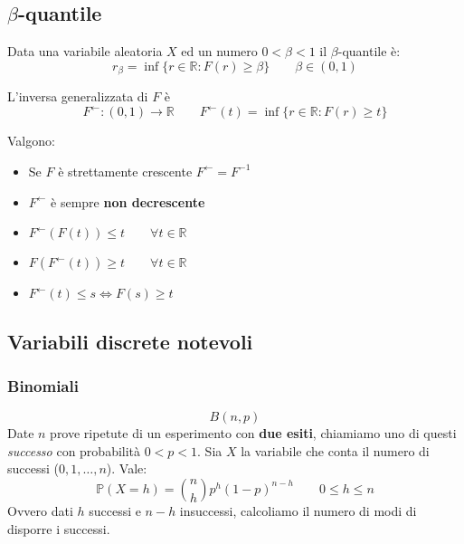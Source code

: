 \subsection{$\beta$-quantile}
\begin{definition}
	Data una variabile aleatoria $X$ ed un numero $0 < \beta < 1$ il $\beta$-quantile è:
	\begin{equation}
		r_\beta = \inf\{r \in \mathbb{R} : F(r) \geq \beta\} \quad\quad \beta \in (0,1)
	\end{equation}
\end{definition}
\begin{definition}
	L'inversa generalizzata di $F$ è
	\begin{equation}
		F^{\leftarrow}:(0,1) \to \mathbb{R} \quad\quad F^{\leftarrow}(t) = \inf\{r \in \mathbb{R} : F(r) \geq t\}
	\end{equation}
\end{definition}
\begin{proposition}
	Valgono:
	\begin{itemize}
		\item Se $F$ è strettamente crescente $F^{\leftarrow} = F^{-1}$
		\item $F^{\leftarrow}$ è sempre \textbf{non decrescente}
		\item $F^{\leftarrow}(F(t))\leq t \quad\quad \forall t \in \mathbb{R}$
		\item $F(F^{\leftarrow}(t)) \geq t \quad\quad \forall t \in \mathbb{R}$
		\item $F^{\leftarrow}(t) \leq s \Longleftrightarrow F(s) \geq t$
	\end{itemize}
\end{proposition}

\subsection{Variabili discrete notevoli}
\subsubsection{Binomiali}
\begin{equation}
	B(n,p)
\end{equation}
Date $n$ prove ripetute di un esperimento con \textbf{due esiti}, chiamiamo uno di questi \textit{successo} con probabilità $0 < p < 1$. Sia $X$ la variabile che conta il numero di successi ($0, 1, \ldots,n$). Vale:
\begin{equation}
	\mathbb{P}(X=h)=\binom{n}{h}p^h(1-p)^{n-h} \quad\quad 0 \leq h \leq n
\end{equation}
Ovvero dati $h$ successi e $n-h$ insuccessi, calcoliamo il numero di modi di disporre i successi.

